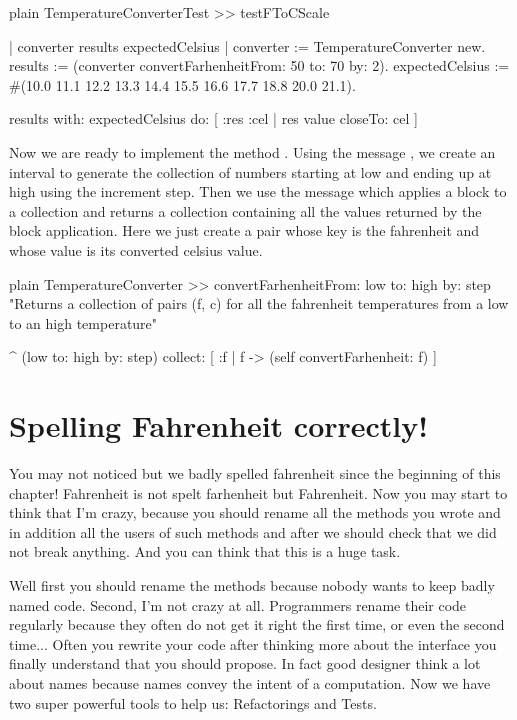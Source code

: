 \documentclass[10pt,twoside,english]{_support/latex/sbabook/sbabook}
\begin{document}
\begin{displaycode}{plain}
TemperatureConverterTest >> testFToCScale

	| converter results expectedCelsius |
	converter := TemperatureConverter new. 
	results := (converter convertFarhenheitFrom: 50 to: 70 by: 2).
	expectedCelsius := #(10.0 11.1 12.2 13.3 14.4 15.5 16.6 17.7 18.8 20.0 21.1).
	
	results with: expectedCelsius 
		do: [ :res :cel | res value closeTo: cel ] 
\end{displaycode}

Now we are ready to implement the method .
Using the message , we create an interval to generate the collection of numbers starting at low and ending up at high using the increment step. Then we use the message  which applies a block to a collection 
and returns a collection containing all the values returned by the block application.
Here we just create a pair whose key is the fahrenheit and whose value is its converted celsius value.

\begin{displaycode}{plain}
TemperatureConverter >> convertFarhenheitFrom: low to: high by: step 
	"Returns a collection of pairs (f, c) for all the fahrenheit temperatures from a low to an high temperature"
	
	^ (low to: high by: step)
		collect: [ :f | f -> (self convertFarhenheit: f) ]
\end{displaycode}
\section{Spelling Fahrenheit correctly!}
You may not noticed but we badly spelled fahrenheit since the beginning of this chapter!
Fahrenheit is not spelt farhenheit but Fahrenheit. Now you may start to think that I'm crazy, because you should rename all the methods you wrote and in addition all the users of such methods and after we should check that we did not break anything. And you can think that this is a huge task.

Well first you should rename the methods because nobody wants to keep badly named code. Second, I'm not crazy at all. Programmers rename their code regularly because they often do not get it right the first time, or even the second time... Often you rewrite your code after thinking more about the interface you finally understand that you should propose. In fact good designer think a lot about names because names convey the intent of a computation. Now we have two super powerful tools to help us: Refactorings and Tests. 
\end{document}
